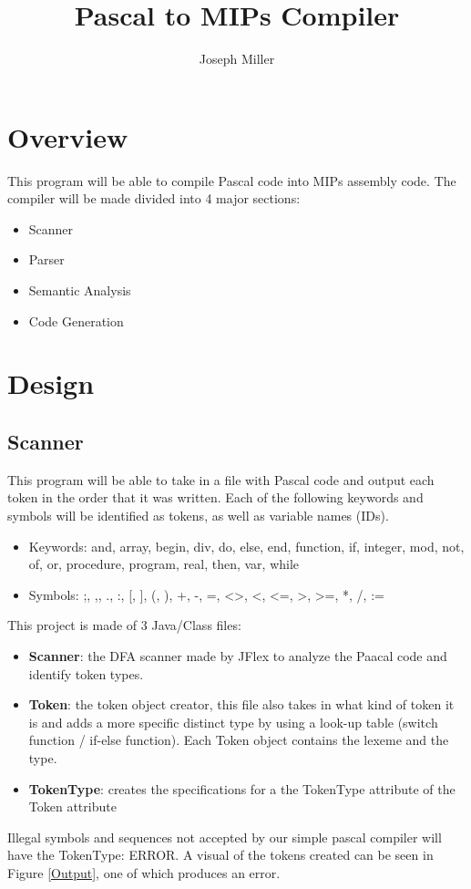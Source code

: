 \documentclass[english]{article}
\begin{document}
\title{Pascal to MIPs Compiler}
\author{Joseph Miller}
\maketitle



\section{Overview}

This program will be able to compile Pascal code into MIPs assembly code.  The compiler will be made divided into 4 major sections:

\begin{itemize}
\item
Scanner
\item
Parser
\item
Semantic Analysis
\item
Code Generation
\end{itemize}

\section{Design}

\subsection{Scanner}

This program will be able to take in a file with Pascal code and output each token in the order that it was written. Each of the following keywords and symbols will be identified as tokens, as well as variable names (IDs).

\renewcommand{\labelitemi}{$\textendash$}
\begin{itemize}
\item
Keywords: and, array, begin, div, do, else, end, function, if, integer, mod, not, of, or, procedure, program, real, then, var, while
\item
Symbols: ;, ,, ., :, [, ], (, ), +, -, =, \textless\textgreater, \textless, \textless=, \textgreater, \textgreater=, *, /, :=
\end{itemize}
This project is made of 3 Java/Class files:
\begin{itemize}

\item
\textbf{Scanner}: the DFA scanner made by JFlex to analyze the Paacal code and identify token types.
\item
\textbf{Token}: the token object creator, this file also takes in what kind of token it is and adds a more specific distinct type by using a look-up table (switch function / if-else function). Each Token object contains the lexeme and the type.
\item
\textbf{TokenType}: creates the specifications for a the TokenType attribute of the Token attribute
\end{itemize}
Illegal symbols and sequences not accepted by our simple pascal compiler will have the TokenType: ERROR. A visual of the tokens created can be seen in Figure \ref{Output}, one of which produces an error.
\end{document}
